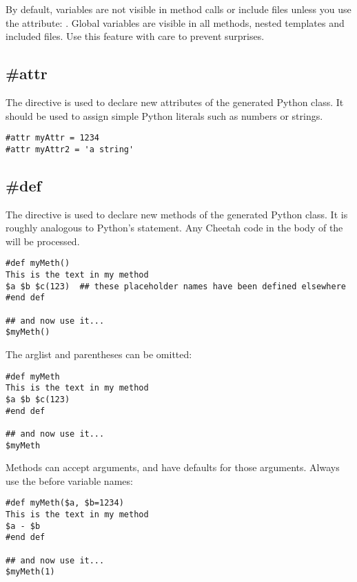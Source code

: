 By default,  variables are not visible in method calls or include
files unless you use the  attribute: .  Global variables are visible in all methods, nested templates and
included files.  Use this feature with care to prevent surprises.


\subsection{\#attr}
\label{inheritanceEtc.attr}

The  directive is used to declare new attributes of the generated Python
class.  It should be used to assign simple Python literals such as numbers or
strings.  

\begin{verbatim}
#attr myAttr = 1234
#attr myAttr2 = 'a string'
\end{verbatim}


\subsection{\#def}
\label{inheritanceEtc.def}

The  directive is used to declare new methods of the generated Python
class.  It is roughly analogous to Python's  statement.  Any Cheetah
code in the body of the  will be processed.  

\begin{verbatim}
#def myMeth()
This is the text in my method 
$a $b $c(123)  ## these placeholder names have been defined elsewhere
#end def

## and now use it...
$myMeth()
\end{verbatim}

The arglist and parentheses can be omitted:
\begin{verbatim}
#def myMeth
This is the text in my method 
$a $b $c(123)
#end def

## and now use it...
$myMeth
\end{verbatim}

Methods can accept arguments, and have defaults for those arguments.  Always use the 
\code{\$} before variable names:
\begin{verbatim}
#def myMeth($a, $b=1234)
This is the text in my method 
$a - $b
#end def

## and now use it...
$myMeth(1)
\end{verbatim}

